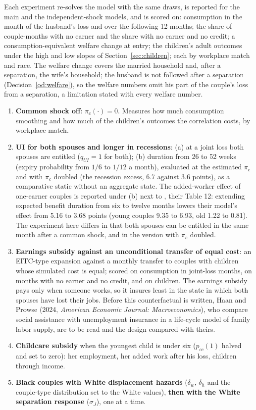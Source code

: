 \documentclass[11pt]{article}
\newcommand{\1}{\mathbf{1}}
\begin{document}
Each experiment re-solves the model with the same draws, is reported for the main and the independent-shock models,
and is scored on: consumption in the month of the husband's loss and over the following 12 months; the share of
couple-months with no earner and the share with no earner and no credit; a consumption-equivalent welfare change at
entry; the children's adult outcomes under the high and low slopes of Section~\ref{sec:children}; each by workplace
match and race. The welfare change covers the married household and, after a separation, the wife's household; the
husband is not followed after a separation (Decision~\ref{od:welfare}), so the welfare numbers omit his part of the
couple's loss from a separation, a limitation stated with every welfare number.
\begin{enumerate}
  \item \textbf{Common shock off}: $\pi_c(\cdot) = 0$. Measures how much consumption smoothing and how much of the
  children's outcomes the correlation costs, by workplace match.
  \item \textbf{UI for both spouses and longer in recessions}: (a) at a joint loss both spouses are entitled ($q_{UI} = 1$
  for both); (b) duration from 26 to 52 weeks (expiry probability from $1/6$ to $1/12$ a month), evaluated at the
  estimated $\pi_c$ and with $\pi_c$ doubled (the recession excess, 6.7 against 3.6 points), as a comparative static
  without an aggregate state. The added-worker effect of one-earner couples is reported under (b) next to
  \citet{bacher2025joint}, their Table 12: extending expected benefit duration from six to twelve months lowers their
  model's effect from 5.16 to 3.68 points (young couples 9.35 to 6.93, old 1.22 to 0.81). The experiment here differs in
  that both spouses can be entitled in the same month after a common shock, and in the version with $\pi_c$ doubled.
  \item \textbf{Earnings subsidy against an unconditional transfer of equal cost}: an EITC-type expansion against a
  monthly transfer to couples with children whose simulated cost is equal; scored on consumption in joint-loss months, on
  months with no earner and no credit, and on children. The earnings subsidy pays only when someone works, so it insures
  least in the state in which both spouses have lost their jobs. Before this counterfactual is written, Haan and Prowse
  (2024, \emph{American Economic Journal: Macroeconomics}), who compare social assistance with unemployment insurance in a
  life-cycle model of family labor supply, are to be read and the design compared with theirs.
  \item \textbf{Childcare subsidy} when the youngest child is under six ($p_{cc}(1)$ halved and set to zero): her
  employment, her added work after his loss, children through income.
  \item \textbf{Black couples with White displacement hazards} ($\delta_w$, $\delta_h$ and the couple-type
  distribution set to the White values), \textbf{then with the White separation response} ($\sigma_J$), one at a time.
\end{enumerate}
\end{document}
